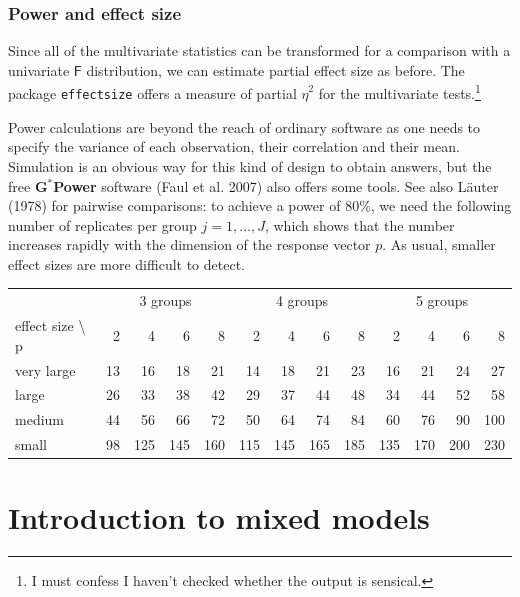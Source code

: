 \documentclass[
  11pt,
  letterpaper,
]{scrbook}
\theoremstyle{definition}
\theoremstyle{remark}
\begin{document}
\hypertarget{power-and-effect-size}{%
\subsection{Power and effect size}\label{power-and-effect-size}}

Since all of the multivariate statistics can be transformed for a
comparison with a univariate \(\mathsf{F}\) distribution, we can
estimate partial effect size as before. The package \texttt{effectsize}
offers a measure of partial \(\widehat{\eta}^2\) for the multivariate
tests.\footnote{I must confess I haven't checked whether the output is
  sensical.}

Power calculations are beyond the reach of ordinary software as one
needs to specify the variance of each observation, their correlation and
their mean. Simulation is an obvious way for this kind of design to
obtain answers, but the free \textbf{G}\({}^{*}\)\textbf{Power} software
(Faul et al. 2007) also offers some tools. See also Läuter (1978) for
pairwise comparisons: to achieve a power of 80\%, we need the following
number of replicates per group \(j=1, \ldots, J\), which shows that the
number increases rapidly with the dimension of the response vector
\(p\). As usual, smaller effect sizes are more difficult to detect.

\begin{table}
\centering
\begin{tabular}[t]{l|r|r|r|r|r|r|r|r|r|r|r|r}
\hline
\multicolumn{1}{c|}{ } & \multicolumn{4}{c|}{3 groups} & \multicolumn{4}{c|}{4 groups} & \multicolumn{4}{c}{5 groups} \\
\cline{2-5} \cline{6-9} \cline{10-13}
effect size \textbackslash{} p & 2 & 4 & 6 & 8 & 2 & 4 & 6 & 8 & 2 & 4 & 6 & 8\\
\hline
very large & 13 & 16 & 18 & 21 & 14 & 18 & 21 & 23 & 16 & 21 & 24 & 27\\
\hline
large & 26 & 33 & 38 & 42 & 29 & 37 & 44 & 48 & 34 & 44 & 52 & 58\\
\hline
medium & 44 & 56 & 66 & 72 & 50 & 64 & 74 & 84 & 60 & 76 & 90 & 100\\
\hline
small & 98 & 125 & 145 & 160 & 115 & 145 & 165 & 185 & 135 & 170 & 200 & 230\\
\hline
\end{tabular}
\end{table}


\hypertarget{introduction-to-mixed-models}{%
\chapter{Introduction to mixed
models}\label{introduction-to-mixed-models}}
\end{document}
